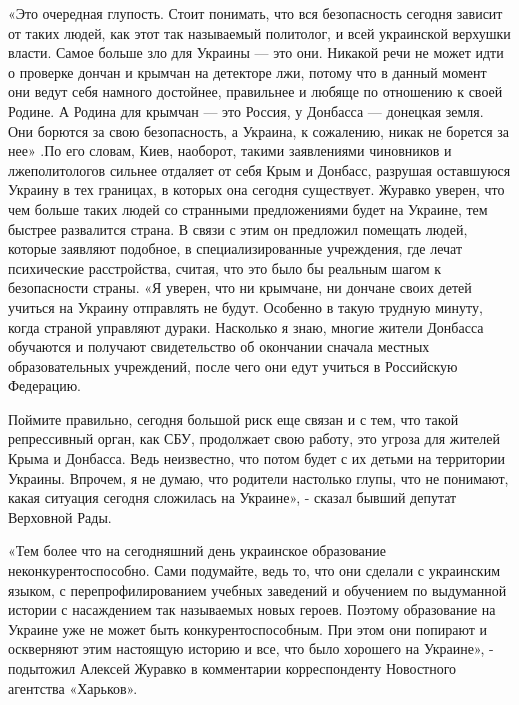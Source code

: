 \documentclass[a4paper,11pt]{extreport}
\begin{document}
«Это очередная глупость. Стоит понимать, что вся безопасность сегодня зависит
от таких людей, как этот так называемый политолог, и всей украинской верхушки
власти. Самое больше зло для Украины --- это они.  Никакой речи не может идти о
проверке дончан и крымчан на детекторе лжи, потому что в данный момент они
ведут себя намного достойнее, правильнее и любяще по отношению к своей Родине.
А Родина для крымчан --- это Россия, у Донбасса --- донецкая земля. Они борются за
свою безопасность, а Украина, к сожалению, никак не борется за нее» .По его
словам, Киев, наоборот, такими заявлениями чиновников и лжеполитологов сильнее
отдаляет от себя Крым и Донбасс, разрушая оставшуюся Украину в тех границах, в
которых она сегодня существует. Журавко уверен, что чем больше таких людей со
странными предложениями будет на Украине, тем быстрее развалится страна. В
связи с этим он предложил помещать людей, которые заявляют подобное, в
специализированные учреждения, где лечат психические расстройства, считая, что
это было бы реальным шагом к безопасности страны.  «Я уверен, что ни крымчане,
ни дончане своих детей учиться на Украину отправлять не будут. Особенно в такую
трудную минуту, когда страной управляют дураки. Насколько я знаю, многие жители
Донбасса обучаются и получают свидетельство об окончании сначала местных
образовательных учреждений, после чего они едут учиться в Российскую Федерацию.

Поймите правильно, сегодня большой риск еще связан и с тем, что такой
репрессивный орган, как СБУ, продолжает свою работу, это угроза для жителей
Крыма и Донбасса. Ведь неизвестно, что потом будет с их детьми на территории
Украины. Впрочем, я не думаю, что родители настолько глупы, что не понимают,
какая ситуация сегодня сложилась на Украине», - сказал бывший депутат Верховной
Рады.

«Тем более что на сегодняшний день украинское образование неконкурентоспособно.
Сами подумайте, ведь то, что они сделали с украинским языком, с
перепрофилированием учебных заведений и обучением по выдуманной истории с
насаждением так называемых новых героев. Поэтому образование на Украине уже не
может быть конкурентоспособным. При этом они попирают и оскверняют этим
настоящую историю и все, что было хорошего на Украине», - подытожил Алексей
Журавко в комментарии корреспонденту Новостного агентства «Харьков».
 
\end{document}
